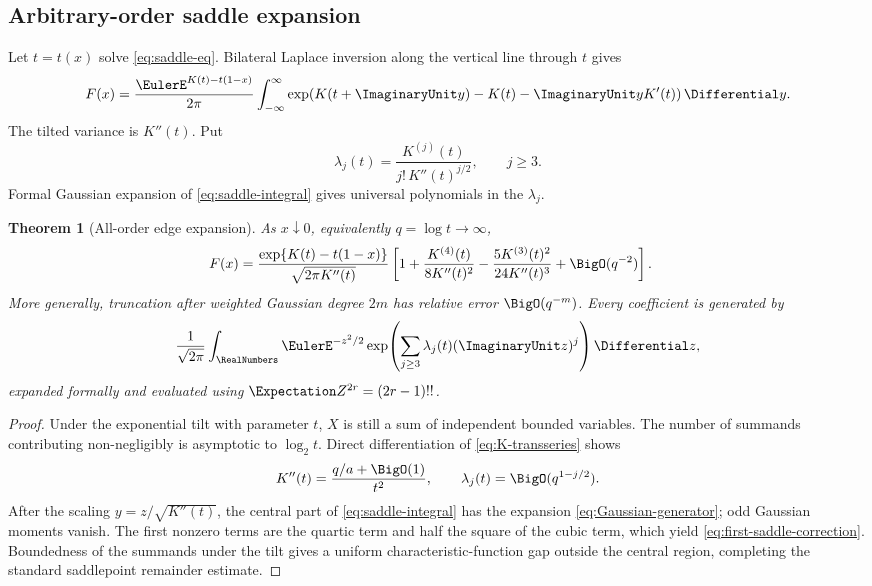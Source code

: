 \documentclass[11pt,oneside]{article}
\newtheorem{theorem}{Theorem}[section]
\theoremstyle{definition}
\theoremstyle{remark}
\begin{document}
\subsection{Arbitrary-order saddle expansion}

Let \(t=t(x)\) solve \eqref{eq:saddle-eq}.  Bilateral Laplace inversion along
the vertical line through \(t\) gives
\[
 F(x)
 =\frac{\EulerE^{K(t)-t(1-x)}}{2\pi}
  \int_{-\infty}^{\infty}
  \exp\!\left(
   K(t+\ImaginaryUnit y)-K(t)-\ImaginaryUnit yK'(t)
  \right)\Differential y.
 \label{eq:saddle-integral}
\]
The tilted variance is \(K''(t)\).  Put
\[
 \lambda_j(t)=
 \frac{K^{(j)}(t)}{j!\,K''(t)^{j/2}},
 \qquad j\geq3.
\]
Formal Gaussian expansion of \eqref{eq:saddle-integral} gives universal
polynomials in the \(\lambda_j\).

\begin{theorem}[All-order edge expansion]
\label{thm:all-order-saddle}
As \(x\downarrow0\), equivalently \(q=\log t\to\infty\),
\begin{align}
 F(x)
 ={}&
 \frac{\exp\{K(t)-t(1-x)\}}
      {\sqrt{2\pi K''(t)}}
 \left[
  1+
  \frac{K^{(4)}(t)}{8K''(t)^2}
  -\frac{5K^{(3)}(t)^2}{24K''(t)^3}
  +\BigO(q^{-2})
 \right].
 \label{eq:first-saddle-correction}
\end{align}
More generally, truncation after weighted Gaussian degree \(2m\) has
relative error \(\BigO(q^{-m})\).  Every coefficient is generated by
\begin{equation}
 \frac1{\sqrt{2\pi}}
 \int_{\RealNumbers}\EulerE^{-z^2/2}
 \exp\!\left(
  \sum_{j\geq3}\lambda_j(t)(\ImaginaryUnit z)^j
 \right)\Differential z,
 \label{eq:Gaussian-generator}
\end{equation}
expanded formally and evaluated using
\(\Expectation Z^{2r}=(2r-1)!!\).
\end{theorem}

\begin{proof}
Under the exponential tilt with parameter \(t\), \(X\) is still a sum of
independent bounded variables.  The number of summands contributing
non-negligibly is asymptotic to \(\log_2t\).  Direct differentiation of
\eqref{eq:K-transseries} shows
\[
 K''(t)=\frac{q/a+\BigO(1)}{t^2},\qquad
 \lambda_j(t)=\BigO(q^{1-j/2}).
\]
After the scaling \(y=z/\sqrt{K''(t)}\), the central part of
\eqref{eq:saddle-integral} has the expansion
\eqref{eq:Gaussian-generator}; odd Gaussian moments vanish.  The first
nonzero terms are the quartic term and half the square of the cubic term,
which yield \eqref{eq:first-saddle-correction}.  Boundedness of the summands
under the tilt gives a uniform characteristic-function gap outside the
central region, completing the standard saddlepoint remainder estimate.
\end{proof}
\end{document}
